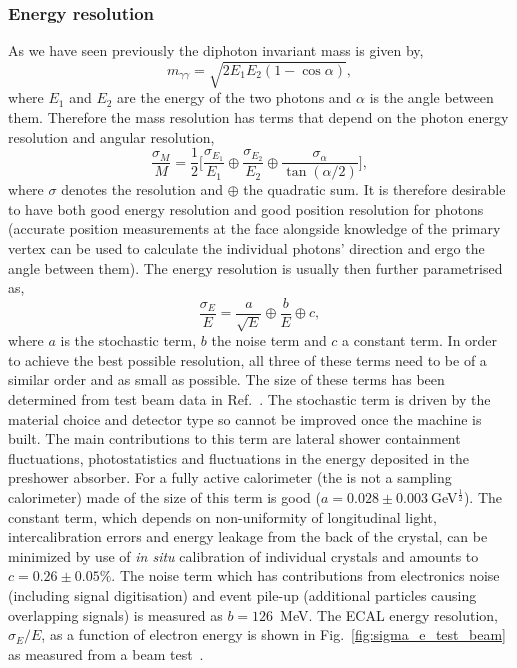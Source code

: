 \subsubsection{Energy resolution}
As we have seen previously the diphoton invariant mass is given by,
\begin{equation}
  m_{\gamma\gamma} = \sqrt{2E_{1}E_{2}(1-\cos\alpha)},
  \label{eq:dipho_inv_mass}
\end{equation}
where $E_{1}$ and $E_{2}$ are the energy of the two photons and $\alpha$ is the angle between them. Therefore the mass resolution has terms that depend on the photon energy resolution and angular resolution,
\begin{equation}
  \frac{\sigma_{M}}{M} = \frac{1}{2} \Biggl[ \frac{\sigma_{E_{1}}}{E_{1}} \oplus \frac{\sigma_{E_{2}}}{E_{2}} \oplus \frac{\sigma_{\alpha}}{\tan(\alpha/2)} \Biggr],
  \label{eq:mass_res}
\end{equation}
where $\sigma$ denotes the resolution and $\oplus$ the quadratic sum. It is therefore desirable to have both good energy resolution and good position resolution for photons (accurate position measurements at the \ECAL face alongside knowledge of the primary vertex can be used to calculate the individual photons' direction and ergo the angle between them). The energy resolution is usually then further parametrised as,
\begin{equation}
  \frac{\sigma_{E}}{E} = \frac{a}{\sqrt{E}} \oplus \frac{b}{E} \oplus c,
  \label{eq:energy_res}
\end{equation}
where $a$ is the stochastic term, $b$ the noise term and $c$ a constant term. In order to achieve the best possible resolution, all three of these terms need to be of a similar order and as small as possible. The size of these terms has been determined from test beam data in Ref.~\cite{CMS_JINST}. The stochastic term is driven by the material choice and detector type so cannot be improved once the machine is built. The main contributions to this term are lateral shower containment fluctuations, photostatistics and fluctuations in the energy deposited in the preshower absorber. For a fully active calorimeter (the \CMS \ECAL is not a sampling calorimeter) made of \PbWO the size of this term is good ($a=0.028\pm0.003~$GeV$^{\frac{1}{2}}$). The constant term, which depends on non-uniformity of longitudinal light, intercalibration errors and energy leakage from the back of the crystal, can be minimized by use of \emph{in situ} calibration of individual crystals and amounts to $c=0.26\pm0.05\%$. The noise term which has contributions from electronics noise (including signal digitisation) and event pile-up (additional particles causing overlapping signals) is measured as $b=126$~MeV. The ECAL energy resolution, $\sigma_{E}/E$, as a function of electron energy is shown in Fig.~\ref{fig:sigma_e_test_beam} as measured from a beam test~\cite{CMS_JINST}. 
